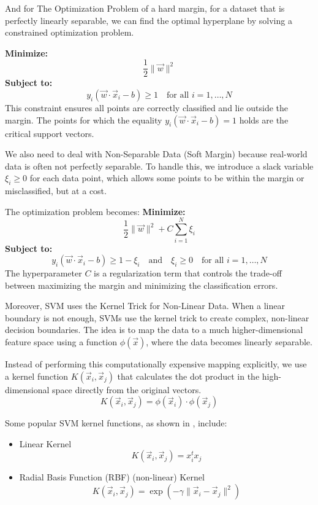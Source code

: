 \documentclass[12pt,a4paper]{article}
\begin{document}
	And for The Optimization Problem of a hard margin, for a dataset that is perfectly linearly separable, we can find the optimal hyperplane by solving a constrained optimization problem.
	
	\textbf{Minimize:}
	\[
	\frac{1}{2} \|\vec{w}\|^2
	\]
	\textbf{Subject to:}
	\[
	y_i(\vec{w} \cdot \vec{x}_i - b) \ge 1 \quad \text{for all } i=1, \dots, N
	\]
	This constraint ensures all points are correctly classified and lie outside the margin. The points for which the equality $y_i(\vec{w} \cdot \vec{x}_i - b) = 1$ holds are the critical support vectors.
	
	We also need to deal with Non-Separable Data (Soft Margin) because real-world data is often not perfectly separable. To handle this, we introduce a slack variable $\xi_i \ge 0$ for each data point, which allows some points to be within the margin or misclassified, but at a cost.
	
	The optimization problem becomes:
	\textbf{Minimize:}
	\[
	\frac{1}{2} \|\vec{w}\|^2 + C \sum_{i=1}^{N} \xi_i
	\]
	\textbf{Subject to:}
	\[
	y_i(\vec{w} \cdot \vec{x}_i - b) \ge 1 - \xi_i \quad \text{and} \quad \xi_i \ge 0 \quad \text{for all } i=1, \dots, N
	\]
	The hyperparameter $C$ is a regularization term that controls the trade-off between maximizing the margin and minimizing the classification errors.
	
	Moreover, SVM uses the Kernel Trick for Non-Linear Data. When a linear boundary is not enough, SVMs use the kernel trick to create complex, non-linear decision boundaries. The idea is to map the data to a much higher-dimensional feature space using a function $\phi(\vec{x})$, where the data becomes linearly separable.
	
	Instead of performing this computationally expensive mapping explicitly, we use a kernel function $K(\vec{x}_i, \vec{x}_j)$ that calculates the dot product in the high-dimensional space directly from the original vectors.
	\[
	K(\vec{x}_i, \vec{x}_j) = \phi(\vec{x}_i) \cdot \phi(\vec{x}_j)
	\]
	
	Some popular SVM kernel functions, as shown in \cite{Dwarakanath2018}, include:
	\begin{itemize}
		\item Linear Kernel
		\[
		K(\vec{x}_i, \vec{x}_j) = x_i^t x_j
		\]
		\item Radial Basis Function (RBF) (non-linear) Kernel
		\[
		K(\vec{x}_i, \vec{x}_j) = \exp(-\gamma \|\vec{x}_i - \vec{x}_j\|^2)
		\]
	\end{itemize}
	
\end{document}
